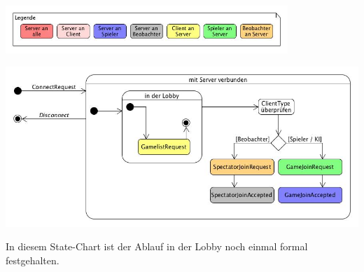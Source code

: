 \documentclass[a4paper, 10pt]{article}
\begin{document}
\newpage
\includegraphics[width=0.8\textwidth]{media/Legend}\par
\includegraphics[width=\textwidth]{media/StateMachineConnectionAndLobby}\par
In diesem State-Chart ist der Ablauf in der Lobby noch einmal formal festgehalten.\par

\newpage
\end{document}
